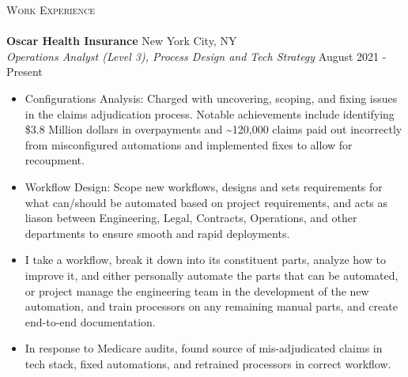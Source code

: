 \documentclass[a4paper]{article}
\newcommand{\lineunder} {
    \vspace*{-8pt} \\
    \hspace*{-18pt} \hrulefill \\
}
\newcommand{\header} [1] {
    {\hspace*{-18pt}\vspace*{6pt} \textsc{#1}}
    \vspace*{-6pt} \lineunder
}
\begin{document}
\header{Work Experience}
\vspace{1mm}
\textbf{Oscar Health Insurance} \hfill New York City, NY\\
\textit{Operations Analyst (Level 3), Process Design and Tech Strategy} \hfill August 2021 - Present\\
\vspace{-1mm}
\begin{itemize} \itemsep 1pt
    \item Configurations Analysis: Charged with uncovering, scoping, and fixing issues in the claims adjudication process. Notable achievements include identifying \$3.8 Million dollars in overpayments and \textasciitilde{}120,000 claims paid out incorrectly from misconfigured automations and implemented fixes to allow for recoupment.

    \item   Workflow Design: Scope new workflows, designs and sets requirements for what can/should be automated based on project requirements, and acts as liason between Engineering, Legal, Contracts, Operations, and other departments to ensure smooth and rapid deployments.

	\item 	I take a workflow, break it down into its constituent parts, analyze how to improve it, and either personally automate the parts that can be automated, or project manage the engineering team in the development of the new automation, and train processors on any remaining manual parts, and create end-to-end documentation.
	\item 	In response to Medicare audits, found source of mis-adjudicated claims in tech stack, fixed automations, and retrained processors in correct workflow.
\end{itemize}
\end{document}
